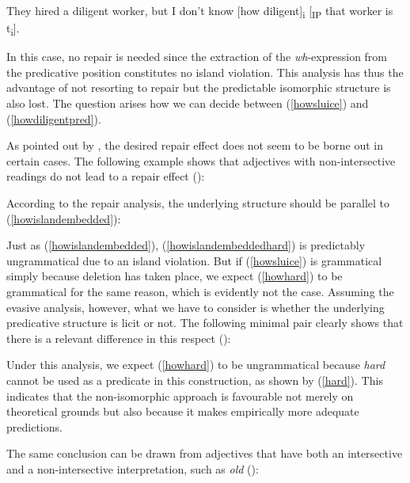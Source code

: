 \ea They hired a diligent worker, but I don't know [how diligent]\textsubscript{i} [\textsubscript{IP} that worker is t\textsubscript{i}]. \label{howdiligentpred}
\z

In this case, no repair is needed since the extraction of the \textit{wh}-expression from the predicative position constitutes no island violation. This analysis has thus the advantage of not resorting to repair but the predictable isomorphic structure is also lost. The question arises how we can decide between (\ref{howsluice}) and (\ref{howdiligentpred}).

As pointed out by \citet[484--485]{vicente2018}, the desired repair effect does not seem to be borne out in certain cases. The following example shows that adjectives with non-intersective readings do not lead to a repair effect (\citealt[485, ex. 12a]{vicente2018}):

\z

According to the repair analysis, the underlying structure should be parallel to (\ref{howislandembedded}):

\z

Just as (\ref{howislandembedded}), (\ref{howislandembeddedhard}) is predictably ungrammatical due to an island violation. But if (\ref{howsluice}) is grammatical simply because deletion has taken place, we expect (\ref{howhard}) to be grammatical for the same reason, which is evidently not the case. Assuming the evasive analysis, however, what we have to consider is whether the underlying predicative structure is licit or not. The following minimal pair clearly shows that there is a relevant difference in this respect (\citealt[485, ex. 13]{vicente2018}):

\ea
{}
\z
\z

Under this analysis, we expect (\ref{howhard}) to be ungrammatical because \textit{hard} cannot be used as a predicate in this construction, as shown by (\ref{hard}). This indicates that the non-isomorphic approach is favourable not merely on theoretical grounds but also because it makes empirically more adequate predictions.

The same conclusion can be drawn from adjectives that have both an intersective and a non-intersective interpretation, such as \textit{old} (\citealt[485, ex. 12b]{vicente2018}):

